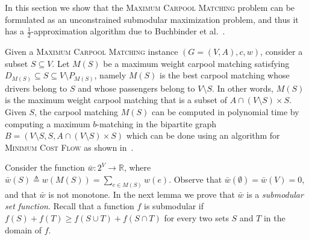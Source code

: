\documentclass[11pt]{article}
\newcommand{\eqdf}{\triangleq}
\def\R{\mathbb{R}}
\newcommand{\carpool}{\textsc{Maximum Carpool Matching}\xspace}
\newcommand{\barw}{\bar{w}}
\begin{document}
In this section we show that the \carpool problem can be formulated as
an unconstrained submodular maximization problem, and thus it has a
$\frac{1}{2}$-approximation algorithm due to Buchbinder et
al.~\cite{BFNS15,buchbinder2016deterministic}.

Given a \carpool instance $(G = (V,A), c, w)$, consider a subset
$S \subseteq V$.  Let $M(S)$ be a maximum weight carpool matching
satisfying $D_{M(S)} \subseteq S \subseteq V \setminus P_{M(S)}$,
namely $M(S)$ is the best carpool matching whose drivers belong to $S$
and whose passengers belong to $V \setminus S$.  In other words,
$M(S)$ is the maximum weight carpool matching that is a subset of
$A \cap (V \setminus S) \times S$.
%
Given $S$, the carpool matching $M(S)$ can be computed in polynomial
time by computing a maximum $b$-matching in the bipartite graph $B =
(V \setminus S, S, A \cap (V \setminus S) \times S)$ which can be done
using an algorithm for \textsc{Minimum Cost Flow} as shown
in~\cite{kutiel2017}.

Consider the function $\barw: 2^V \to \R$, where $\barw(S) \eqdf
w(M(S)) = \sum_{e \in M(S)} w(e)$.  Observe that $\barw(\emptyset)
= \barw(V) = 0$, and that $\barw$ is not monotone.
%
In the next lemma we prove that $\bar{w}$ is a \emph{submodular set
function}.  Recall that a function $f$ is submodular if $f(S) +
f(T) \geq f(S \cup T) + f(S \cap T)$ for every two sets $S$ and $T$ in
the domain of $f$.
\end{document}
